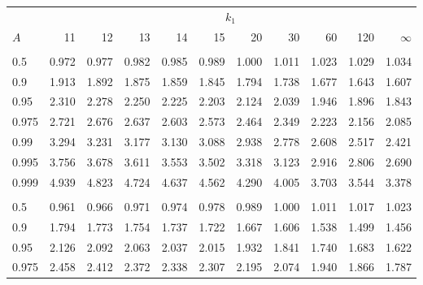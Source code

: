 \documentclass[
]{article}
\begin{document}
\begin{table}[H]
\centering
\begin{tabular}{lrrrrrrrrrr}
\toprule
\multicolumn{1}{c}{ } & \multicolumn{10}{c}{$k_1$} \\
\cmidrule(l{3pt}r{3pt}){2-11}
\hspace{1.1em}$A$ & 11 & 12 & 13 & 14 & 15 & 20 & 30 & 60 & 120 & $\infty$\\
\midrule
\addlinespace[0.3em]
\multicolumn{11}{l}{\textbf{$k_2=20$}}\\
\hspace{1em}0.5 & 0.972 & 0.977 & 0.982 & 0.985 & 0.989 & 1.000 & 1.011 & 1.023 & 1.029 & 1.034\\
\hspace{1em}0.9 & 1.913 & 1.892 & 1.875 & 1.859 & 1.845 & 1.794 & 1.738 & 1.677 & 1.643 & 1.607\\
\hspace{1em}0.95 & 2.310 & 2.278 & 2.250 & 2.225 & 2.203 & 2.124 & 2.039 & 1.946 & 1.896 & 1.843\\
\hspace{1em}0.975 & 2.721 & 2.676 & 2.637 & 2.603 & 2.573 & 2.464 & 2.349 & 2.223 & 2.156 & 2.085\\
\hspace{1em}0.99 & 3.294 & 3.231 & 3.177 & 3.130 & 3.088 & 2.938 & 2.778 & 2.608 & 2.517 & 2.421\\
\hspace{1em}0.995 & 3.756 & 3.678 & 3.611 & 3.553 & 3.502 & 3.318 & 3.123 & 2.916 & 2.806 & 2.690\\
\hspace{1em}0.999 & 4.939 & 4.823 & 4.724 & 4.637 & 4.562 & 4.290 & 4.005 & 3.703 & 3.544 & 3.378\\
\addlinespace[0.3em]
\multicolumn{11}{l}{\textbf{$k_2=30$}}\\
\hspace{1em}0.5 & 0.961 & 0.966 & 0.971 & 0.974 & 0.978 & 0.989 & 1.000 & 1.011 & 1.017 & 1.023\\
\hspace{1em}0.9 & 1.794 & 1.773 & 1.754 & 1.737 & 1.722 & 1.667 & 1.606 & 1.538 & 1.499 & 1.456\\
\hspace{1em}0.95 & 2.126 & 2.092 & 2.063 & 2.037 & 2.015 & 1.932 & 1.841 & 1.740 & 1.683 & 1.622\\
\hspace{1em}0.975 & 2.458 & 2.412 & 2.372 & 2.338 & 2.307 & 2.195 & 2.074 & 1.940 & 1.866 & 1.787\\

\end{tabular}
\end{table}
\end{document}
